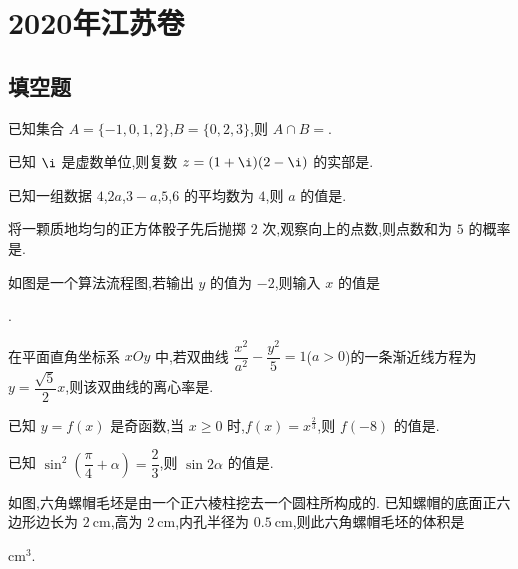 \chapter{2020年江苏卷}

\section{填空题}

\begin{problem}
已知集合 \(A=\{-1,0,1,2\}\),\(B=\{0,2,3\}\),则 \(A\cap B=\)\fillinblank{}.
\end{problem}

\begin{problem}
已知 \(\i\) 是虚数单位,则复数 \(z=(1+\i)(2-\i)\) 的实部是\fillinblank{}.
\end{problem}

\begin{problem}
已知一组数据 \(4\),\(2a\),\(3-a\),\(5\),\(6\) 的平均数为 \(4\),则 \(a\) 的值是\fillinblank{}.
\end{problem}

\begin{problem}
将一颗质地均匀的正方体骰子先后抛掷 \(2\) 次,观察向上的点数,则点数和为 \(5\) 的概率是\fillinblank{}.
\end{problem}

\begin{problem}
如图是一个算法流程图,若输出 \(y\) 的值为 \(-2\),则输入 \(x\) 的值是


\fillinblank{}.
\end{problem}

\begin{problem}
在平面直角坐标系 \(xOy\) 中,若双曲线 \(\dfrac{x^2}{a^2}-\dfrac{y^2}{5}=1\)(\(a>0\))的一条渐近线方程为 \(y=\dfrac{\sqrt5}{2}x\),则该双曲线的离心率是\fillinblank{}.
\end{problem}

\begin{problem}
已知 \(y=f(x)\) 是奇函数,当 \(x\ge0\) 时,\(f(x)=x^{\frac23}\),则 \(f(-8)\) 的值是\fillinblank{}.
\end{problem}

\begin{problem}
已知 \(\sin^2\!\left(\dfrac\pi4+\alpha\right)=\dfrac23\),则 \(\sin2\alpha\) 的值是\fillinblank{}.
\end{problem}

\begin{problem}
如图,六角螺帽毛坯是由一个正六棱柱挖去一个圆柱所构成的. 已知螺帽的底面正六边形边长为 \(2\mathrm{~cm}\),高为 \(2\mathrm{~cm}\),内孔半径为 \(0.5\mathrm{~cm}\),则此六角螺帽毛坯的体积是


\fillinblank{}\(\mathrm{cm}^3\).
\end{problem}

